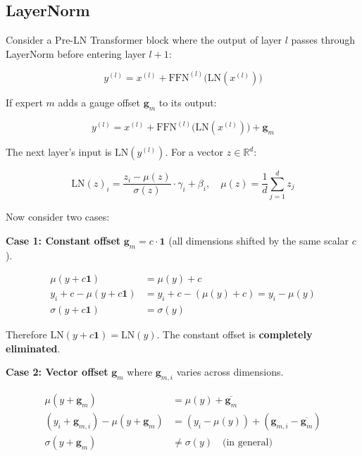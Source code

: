 \documentclass[11pt,a4paper]{article}
\newcommand{\R}{\mathbb{R}}
\newcommand{\gauge}{\mathbf{g}}
\begin{document}
\subsection{LayerNorm }

Consider a Pre-LN Transformer block where the output of layer $l$ passes
through LayerNorm before entering layer $l+1$:

\begin{equation}
    y^{(l)} = x^{(l)} + \text{FFN}^{(l)}\bigl(\text{LN}(x^{(l)})\bigr)
\end{equation}

If expert $m$ adds a gauge offset $\gauge_m$ to its output:

\begin{equation}
    y^{(l)} = x^{(l)} + \text{FFN}^{(l)}\bigl(\text{LN}(x^{(l)})\bigr) + \gauge_m
\end{equation}

The next layer's input is $\text{LN}(y^{(l)})$. For a vector $z \in \R^d$:

\begin{equation}
    \text{LN}(z)_i = \frac{z_i - \mu(z)}{\sigma(z)} \cdot \gamma_i + \beta_i,
    \quad \mu(z) = \frac{1}{d}\sum_{j=1}^d z_j
\end{equation}

Now consider two cases:

\medskip
\noindent\textbf{Case 1: Constant offset} $\gauge_m = c \cdot \mathbf{1}$ (all dimensions
shifted by the same scalar $c$).

\begin{align}
    \mu(y + c\mathbf{1}) &= \mu(y) + c \\
    y_i + c - \mu(y + c\mathbf{1}) &= y_i + c - (\mu(y) + c) = y_i - \mu(y) \\
    \sigma(y + c\mathbf{1}) &= \sigma(y)
\end{align}

Therefore $\text{LN}(y + c\mathbf{1}) = \text{LN}(y)$. The constant offset is
\textbf{completely eliminated}.

\medskip
\noindent\textbf{Case 2: Vector offset} $\gauge_m$ where $\gauge_{m,i}$ varies
across dimensions.

\begin{align}
    \mu(y + \gauge_m) &= \mu(y) + \overline{\gauge_m} \\
    (y_i + \gauge_{m,i}) - \mu(y + \gauge_m) &= (y_i - \mu(y)) + (\gauge_{m,i} - \overline{\gauge_m}) \\
    \sigma(y + \gauge_m) &\neq \sigma(y) \quad \text{(in general)}
\end{align}
\end{document}
